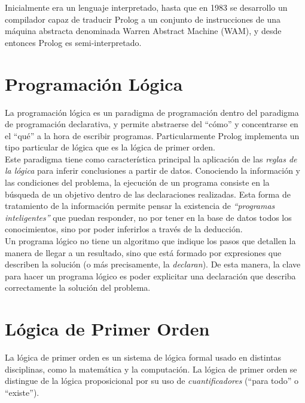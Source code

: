 \documentclass[12pt,titlepage]{article}
\begin{document}
Inicialmente era un lenguaje interpretado, hasta que en 1983 se desarrollo un compilador capaz de traducir Prolog a un conjunto de instrucciones de una máquina abstracta denominada Warren Abstract Machine (WAM), y desde entonces Prolog es semi-interpretado. \\

\section{Programación Lógica}
La programación lógica es un paradigma de programación dentro del paradigma de programación declarativa, y permite abstraerse del ``cómo'' y concentrarse en el ``qué'' a la hora de escribir programas. Particularmente Prolog implementa un tipo particular de lógica que es la lógica de primer orden. \\

Este paradigma tiene como característica principal la aplicación de las \emph{reglas de la lógica} para inferir conclusiones a partir de datos. Conociendo la información y las condiciones del problema, la ejecución de un programa consiste en la búsqueda de un objetivo dentro de las declaraciones realizadas. Esta forma de tratamiento de la información permite pensar la existencia de \emph{``programas inteligentes''} que puedan responder, no por tener en la base de datos todos los conocimientos, sino por poder inferirlos a través de la deducción.  \\

Un programa lógico no tiene un algoritmo que indique los pasos que detallen la manera de llegar a un resultado, sino que está formado por expresiones que describen la solución (o más precisamente, la \emph{declaran}). De esta manera, la clave para hacer un programa lógico es poder explicitar una declaración que describa correctamente la solución del problema. \\

\newpage

\section{Lógica de Primer Orden}

La lógica de primer orden es un sistema de lógica formal usado en distintas disciplinas, como la matemática y la computación. La lógica de primer orden se distingue de la lógica proposicional por su uso de \emph{cuantificadores} (``para todo'' o ``existe''). \\
\end{document}
